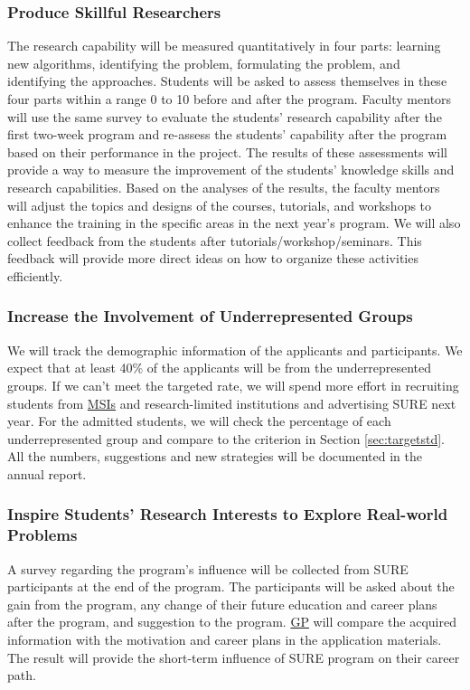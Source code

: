\documentclass[11pt]{NSFamsart}
\newcommand{\GP}{\hyperlink{GPlink}{GP}\xspace}
\newcommand{\MSIs}{\hyperlink{MSIlink}{MSIs}\xspace}
\begin{document}
\subsubsection{Produce Skillful Researchers} \label{sec:hardskill}
The research capability will be measured quantitatively in four parts: learning new algorithms, identifying the problem, formulating the problem, and identifying the approaches.
Students will be asked to assess themselves in these four parts within a range 0 to 10 before and after the program. Faculty mentors will use the same survey to evaluate the students’ research capability after the first two-week program and re-assess the students’ capability after the program based on their performance in the project.
The results of these assessments will provide a way to measure the improvement of the students' knowledge skills and research capabilities. Based on the analyses of the results, the faculty mentors will adjust the topics and designs of the courses, tutorials,  and workshops to enhance the training in the specific areas in the next year's program.
We will also collect feedback from the students after tutorials/workshop/seminars. This feedback will provide more direct ideas on how to organize these activities efficiently.

\subsubsection{Increase the Involvement of Underrepresented Groups}
We will track the demographic information of the applicants and participants. We expect that at least 40\% of the applicants will be from the underrepresented groups. If we can't meet the targeted rate, we will spend more effort in recruiting students from \MSIs and research-limited institutions and advertising SURE next year. For the admitted students, we will check the percentage of each underrepresented group and compare to the criterion in Section \ref{sec:targetstd}. All the numbers, suggestions and new strategies will be documented in the annual report. 

\subsubsection{
Inspire Students' Research Interests to Explore Real-world Problems}

A survey regarding the program's influence will be collected from SURE participants at the end of the program. The participants will be asked about the gain from the program, any change of their future education and career plans after the program, and suggestion to the program. \GP will compare the acquired information with the motivation and career plans in the application materials. The result will provide the short-term influence of SURE program on their career path.
\end{document}
